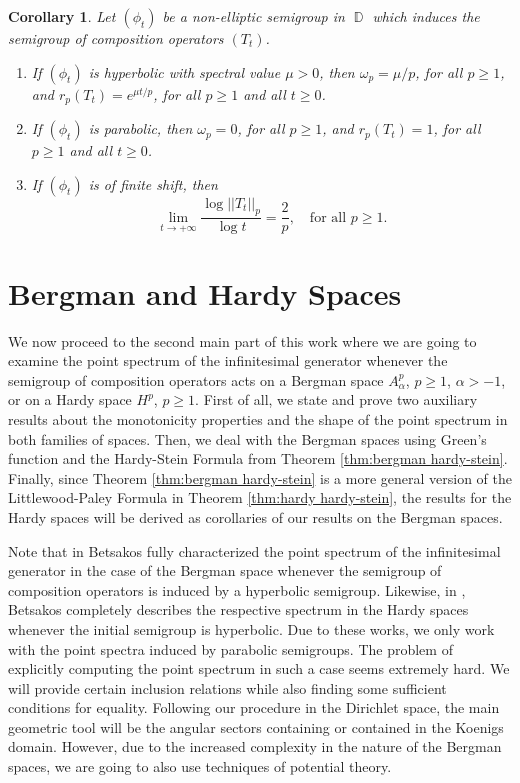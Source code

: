 \documentclass[11pt]{amsart}
\numberwithin{equation}{section}
\newtheorem{corollary}[theorem]{Corollary}
\theoremstyle{definition}
\DeclareMathOperator{\D}{\mathbb{D}}
\begin{document}
	\begin{corollary}\label{cor:type hardy}
		Let $(\phi_t)$ be a non-elliptic semigroup in $\D$ which induces the semigroup of composition operators $(T_t)$.
		\begin{enumerate}
			\item[\textup{(a)}] If $(\phi_t)$ is hyperbolic with spectral value $\mu>0$, then $\omega_p=\mu/p$, for all $p\ge1$, and $r_p(T_t)=e^{\mu t/p}$, for all $p\ge1$ and all $t\ge0$.
			\item[\textup{(b)}] If $(\phi_t)$ is parabolic, then $\omega_p=0$, for all $p\ge1$, and $r_p(T_t)=1$, for all $p\ge1$ and all $t\ge0$.
			\item[\textup{(c)}] If $(\phi_t)$ is of finite shift, then
			$$\lim\limits_{t\to+\infty}\dfrac{\log||T_t||_p}{\log t}=\dfrac{2}{p}, \quad \text{for all }p\ge1.$$
		\end{enumerate}
	\end{corollary}
	
	
	
	
	
	\section{\quad Bergman and Hardy Spaces}\label{sec:bergman and hardy}
	
	We now proceed to the second main part of this work where we are going to examine the point spectrum of the infinitesimal generator whenever the semigroup of composition operators acts on a Bergman space $A_\alpha^p$, $p\ge1$, $\alpha>-1$, or on a Hardy space $H^p$, $p\ge1$. First of all, we state and prove two auxiliary results about the monotonicity properties and the shape of the point spectrum in both families of spaces. Then, we deal with the Bergman spaces using Green's function and the Hardy-Stein Formula from Theorem \ref{thm:bergman hardy-stein}. Finally, since Theorem \ref{thm:bergman hardy-stein} is a more general version of the Littlewood-Paley Formula in Theorem \ref{thm:hardy hardy-stein}, the results for the Hardy spaces will be derived as corollaries of our results on the Bergman spaces.
	
	Note that in \cite{Betsakos_Bergman} Betsakos fully characterized the point spectrum of the infinitesimal generator in the case of the Bergman space whenever the semigroup of composition operators is induced by a hyperbolic semigroup. Likewise, in \cite{betsakos_eig}, Betsakos completely describes the respective spectrum in the Hardy spaces whenever the initial semigroup is hyperbolic. Due to these works, we only work with the point spectra induced by parabolic semigroups. The problem of explicitly computing the point spectrum in such a case seems extremely hard. We will provide certain inclusion relations while also finding some sufficient conditions for equality. Following our procedure in the Dirichlet space, the main geometric tool will be the angular sectors containing or contained in the Koenigs domain. However, due to the increased complexity in the nature of the Bergman spaces, we are going to also use techniques of potential theory.
	
\end{document}

